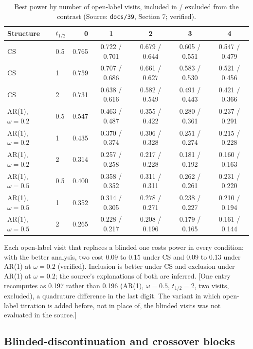 \documentclass[11pt]{article}
\newcommand{\note}[1]{\textcolor{blue!60!black}{\small [#1]}}
\newcommand{\code}[1]{\texttt{#1}}
\begin{document}
\begin{table}[h]
\centering\small
\caption{Best power by number of open-label visits, included in / excluded
from the contrast (Source: \code{docs/39}, Section 7; verified).}
\label{tab:invf-ol}
\begin{tabular}{@{}llrcccc@{}}
\toprule
Structure & $t_{1/2}$ & 0 & 1 & 2 & 3 & 4 \\
\midrule
CS & 0.5 & 0.765 & 0.722 / 0.701 & 0.679 / 0.644 & 0.605 / 0.551 & 0.547 / 0.479 \\
CS & 1 & 0.759 & 0.707 / 0.686 & 0.661 / 0.627 & 0.583 / 0.530 & 0.521 / 0.456 \\
CS & 2 & 0.731 & 0.638 / 0.616 & 0.582 / 0.549 & 0.491 / 0.443 & 0.421 / 0.366 \\
AR(1), $\omega = 0.2$ & 0.5 & 0.547 & 0.463 / 0.487 & 0.355 / 0.422 & 0.280 / 0.361 & 0.237 / 0.291 \\
AR(1), $\omega = 0.2$ & 1 & 0.435 & 0.370 / 0.374 & 0.306 / 0.328 & 0.251 / 0.274 & 0.215 / 0.228 \\
AR(1), $\omega = 0.2$ & 2 & 0.314 & 0.257 / 0.258 & 0.217 / 0.228 & 0.181 / 0.192 & 0.160 / 0.163 \\
AR(1), $\omega = 0.5$ & 0.5 & 0.400 & 0.358 / 0.352 & 0.311 / 0.311 & 0.262 / 0.261 & 0.231 / 0.220 \\
AR(1), $\omega = 0.5$ & 1 & 0.352 & 0.314 / 0.305 & 0.278 / 0.271 & 0.238 / 0.227 & 0.210 / 0.194 \\
AR(1), $\omega = 0.5$ & 2 & 0.265 & 0.228 / 0.217 & 0.208 / 0.196 & 0.179 / 0.165 & 0.161 / 0.144 \\
\bottomrule
\end{tabular}
\end{table}

\noindent Each open-label visit that replaces a blinded one costs power
in every condition; with the better analysis, two cost 0.09 to 0.15
under CS and 0.09 to 0.13 under AR(1) at $\omega = 0.2$ (verified).
Inclusion is better under CS and exclusion under AR(1) at $\omega =
0.2$; the source's explanations of both are inferred. \note{One entry
recomputes as 0.197 rather than 0.196 (AR(1), $\omega = 0.5$,
$t_{1/2} = 2$, two visits, excluded), a quadrature difference in the
last digit. The variant in which open-label titration is added before,
not in place of, the blinded visits was not evaluated in the source.}

\subsection{Blinded-discontinuation and crossover blocks}
\label{sec:invf-blocks}
\end{document}

